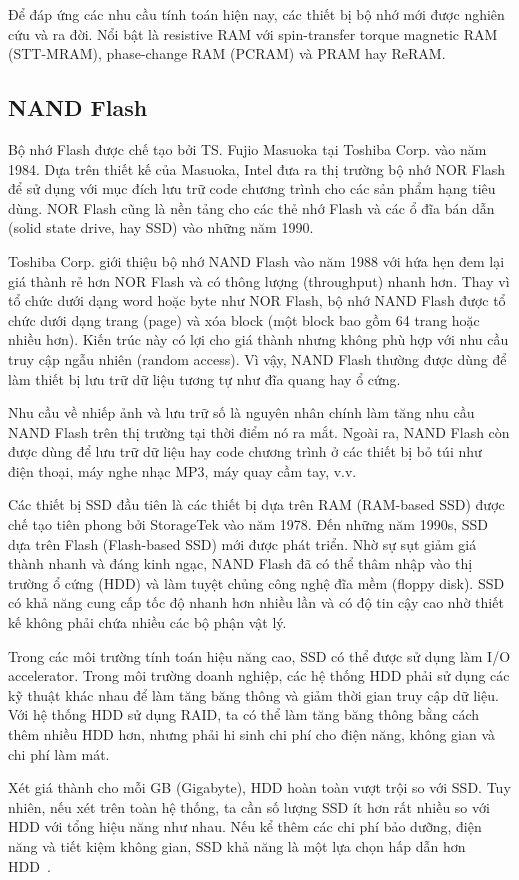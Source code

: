Để đáp ứng các nhu cầu tính toán hiện nay, các thiết bị bộ nhớ mới được nghiên
cứu và ra đời. Nổi bật là resistive RAM với spin-transfer torque magnetic RAM
(STT-MRAM), phase-change RAM (PCRAM) và PRAM hay ReRAM.

\subsection{NAND Flash}
Bộ nhớ Flash được chế tạo bởi TS. Fujio Masuoka tại Toshiba Corp. vào năm 1984.
Dựa trên thiết kế của Masuoka, Intel đưa ra thị trường bộ nhớ NOR Flash để sử
dụng với mục đích lưu trữ code chương trình cho các sản phẩm hạng tiêu dùng.
NOR Flash cũng là nền tảng cho các thẻ nhớ Flash và các ổ đĩa bán dẫn (solid
state drive, hay SSD) vào những năm 1990.

Toshiba Corp. giới thiệu bộ nhớ NAND Flash vào năm 1988 với hứa hẹn đem lại giá
thành rẻ hơn NOR Flash và có thông lượng (throughput) nhanh hơn. Thay vì tổ
chức dưới dạng word hoặc byte như NOR Flash, bộ nhớ NAND Flash được tổ chức
dưới dạng trang (page) và xóa block (một block bao gồm 64 trang hoặc nhiều
hơn). Kiến trúc này có lợi cho giá thành nhưng không phù hợp với nhu cầu truy
cập ngẫu nhiên (random access). Vì vậy, NAND Flash thường được dùng để làm
thiết bị lưu trữ dữ liệu tương tự như đĩa quang hay ổ cứng.


Nhu cầu về nhiếp ảnh và lưu trữ số là nguyên nhân chính làm tăng nhu cầu NAND
Flash trên thị trường tại thời điểm nó ra mắt. Ngoài ra, NAND Flash còn được
dùng để lưu trữ dữ liệu hay code chương trình ở các thiết bị bỏ túi như điện
thoại, máy nghe nhạc MP3, máy quay cầm tay, v.v.

Các thiết bị SSD đầu tiên là các thiết bị dựa trên RAM (RAM-based SSD) được chế
tạo tiên phong bởi StorageTek vào năm 1978. Đến những năm 1990s, SSD dựa trên
Flash (Flash-based SSD) mới được phát triển. Nhờ sự sụt giảm giá thành nhanh và
đáng kinh ngạc, NAND Flash đã có thể thâm nhập vào thị trường ổ cứng (HDD) và
làm tuyệt chủng công nghệ đĩa mềm (floppy disk). SSD có khả năng cung cấp tốc
độ nhanh hơn nhiều lần và có độ tin cậy cao nhờ thiết kế không phải chứa nhiều
các bộ phận vật lý.

Trong các môi trường tính toán hiệu năng cao, SSD có thể được sử dụng làm I/O
accelerator. Trong môi trường doanh nghiệp, các hệ thống HDD phải sử dụng các
kỹ thuật khác nhau để làm tăng băng thông và giảm thời gian truy cập dữ liệu.
Với hệ thống HDD sử dụng RAID, ta có thể làm tăng băng thông bằng cách thêm
nhiều HDD hơn, nhưng phải hi sinh chi phí cho điện năng, không gian và chi phí
làm mát.

Xét giá thành cho mỗi GB (Gigabyte), HDD hoàn toàn vượt trội so với SSD. Tuy
nhiên, nếu xét trên toàn hệ thống, ta cần số lượng SSD ít hơn rất nhiều so với
HDD với tổng hiệu năng như nhau. Nếu kể thêm các chi phí bảo dưỡng, điện năng
và tiết kiệm không gian, SSD khả năng là một lựa chọn hấp dẫn hơn
HDD~\cite{wongMarketApplicationsNAND2010}.